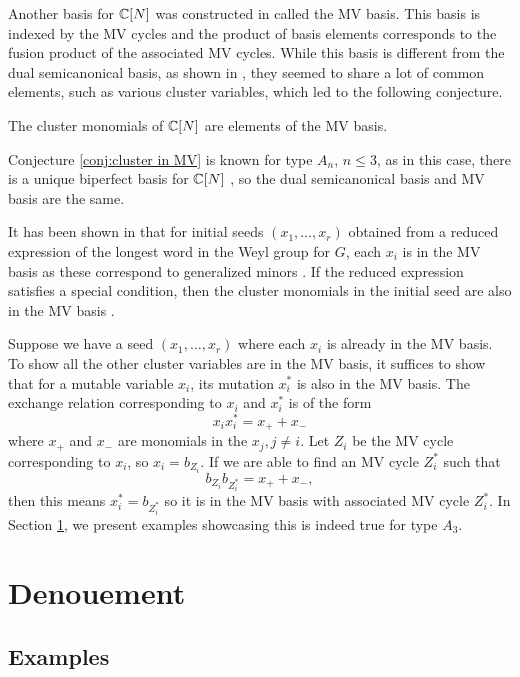 \documentclass{article} %
\begin{document}
Another basis for $\mathbb C[N]$ was constructed in \cite{mirkovic2007geometric} called the MV basis. This basis is indexed by the MV cycles and the product of basis elements corresponds to the fusion product of the associated MV cycles. While this basis is different from the dual semicanonical basis, as shown in \cite{baumann2019mirkovic}, they seemed to share a lot of common elements, such as various cluster variables, which led to the following conjecture.

\begin{conjecture}\label{conj:cluster in MV}
    The cluster monomials of $\mathbb C[N]$ are elements of the MV basis.
\end{conjecture}

Conjecture \ref{conj:cluster in MV} is known for type $A_n$, $n \leq 3$, as in this case, there is a unique biperfect basis for $\mathbb C[N]$ \cite{baumann2019mirkovic}, so the dual semicanonical basis and MV basis are the same.

It has been shown in \cite{kato2011polytopal} that for initial seeds $(x_1, \dots, x_r)$ obtained from a reduced expression of the longest word in the Weyl group for $G$, each $x_i$ is in the MV basis as these correspond to generalized minors \cite{berenstein2005cluster3}\cite{geiss2007initial}. If the reduced expression satisfies a special condition, then the cluster monomials in the initial seed are also in the MV basis \cite{baumann2020bases}.

Suppose we have a seed $(x_1, \dots, x_r)$ where each $x_i$ is already in the MV basis. To show all the other cluster variables are in the MV basis, it suffices to show that for a mutable variable $x_i$, its mutation $x_i^*$ is also in the MV basis. The exchange relation corresponding to $x_i$ and $x_i^*$ is of the form
$$x_ix_i^* = x_+ + x_-$$
where $x_+$ and $x_-$ are monomials in the $x_j,j\neq i$. Let $Z_i$ be the MV cycle corresponding to $x_i$, so $x_i = b_{Z_i}$. If we are able to find an MV cycle $Z_i^*$ such that
$$b_{Z_i} b_{Z_i^*} = x_+ + x_-,$$
then this means $x_i^* = b_{Z_i^*}$ so it is in the MV basis with associated MV cycle $Z_i^*$. In Section \ref{s:denouement}, we present examples showcasing this is indeed true for type $A_3$. 
\section{Denouement}
\label{s:denouement}
\subsection{Examples}
\end{document}
